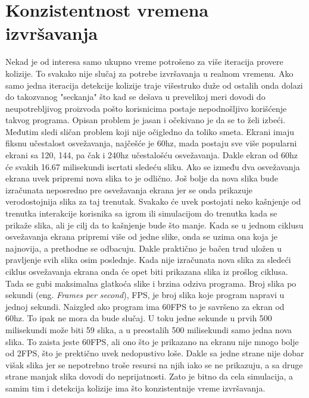 \documentclass[12pt,oneside]{memoir}
\begin{document}
\section{Konzistentnost vremena izvršavanja}

Nekad je od interesa samo ukupno vreme potrošeno za više iteracija provere kolizije.
To svakako nije slučaj za potrebe izvršavanja u realnom vremenu. Ako samo jedna iteracija 
detekcije kolizije traje višestruko duže od ostalih onda dolazi do takozvanog "seckanja" što
kad se dešava  u prevelikoj meri dovodi do neupotrebljivog proizvoda pošto korisnicima postaje nepodnošljivo
korišćenje takvog programa.
Opisan problem je jasan i očekivano je da se to želi izbeći. 
Međutim sledi sličan problem koji nije očigledno da toliko smeta.
Ekrani imaju fiksnu učestalost osvežavanja, najčešće je 60hz, mada postaju sve više popularni 
ekrani sa 120, 144, pa čak i 240hz učestalošću osvežavanja. Dakle ekran od 60hz će svakih 
16.67 milisekundi iscrtati sledeću sliku. Ako se između dva osvežavanja ekrana uvek pripremi
nova slika to je odlično. 
Još bolje da nova slika bude izračunata neposredno pre osvežavanja ekrana jer se onda 
prikazuje verodostojnija slika za taj trenutak. 
Svakako će uvek postojati neko kašnjenje od trenutka interakcije korisnika sa igrom ili simulacijom do
trenutka kada se prikaže slika, ali je cilj da to kašnjenje bude što manje. 
Kada se u jednom ciklusu osvežavanja ekrana pripremi više od jedne slike, onda se uzima ona koja je najnovija,
a prethodne se odbacuju. 
Dakle praktično je bačen trud uložen u pravljenje svih slika osim poslednje.
Kada nije izračunata nova slika za sledeći ciklus osvežavanja ekrana onda će opet biti prikazana slika
iz prošlog ciklusa. Tada se gubi maksimalna glatkoća slike i brzina odziva programa. 
Broj slika po sekundi (eng. {\em Frames per second}), FPS, je broj slika koje program napravi u jednoj sekundi.
Naizgled ako program ima 60FPS to je savršeno za ekran od 60hz. To ipak ne mora da bude slučaj.
U toku jedne sekunde u prvih 500 milisekundi može biti 59 slika, a u preostalih 500 milisekundi samo jedna 
nova slika. To zaista jeste 60FPS, ali ono što je prikazano na ekranu nije mnogo bolje od 2FPS,
što je prektično uvek nedopustivo loše. 
Dakle sa jedne strane nije dobar višak slika jer se nepotrebno troše resursi na njih iako se ne prikazuju, 
a sa druge strane manjak slika dovodi do neprijatnosti.
Zato je bitno da cela simulacija, a samim tim i detekcija kolizije ima što konzistentnije vreme izvršavanja.
\end{document}

